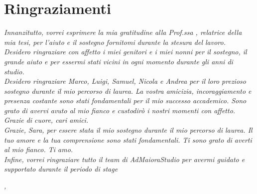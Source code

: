 \cleardoublepage
{}
{}



\bigskip

\begingroup
\let\clearpage\relax
\let\cleardoublepage\relax
\let\cleardoublepage\relax

\chapter*{Ringraziamenti}

\noindent \textit{Innanzitutto, vorrei esprimere la mia gratitudine alla Prof.ssa \myProf, relatrice della mia tesi, per l'aiuto e il sostegno fornitomi durante la stesura del lavoro.}\\

\noindent \textit{Desidero ringraziare con affetto i miei genitori e i miei nonni per il sostegno, il grande aiuto e per essermi stati vicini in ogni momento durante gli anni di studio.}\\

\noindent \textit{Desidero ringraziare Marco, Luigi, Samuel, Nicola e Andrea per il loro prezioso sostegno durante il mio percorso di laurea. La vostra amicizia, incoraggiamento e presenza costante sono stati fondamentali per il mio successo accademico. Sono grato di avervi avuto al mio fianco e custodirò i nostri momenti con affetto. Grazie di cuore, cari amici.}\\

\noindent \textit{Grazie, Sara, per essere stata il mio sostegno durante il mio percorso di laurea. Il tuo amore e la tua comprensione sono stati fondamentali. Ti sono grato di averti al mio fianco. Ti amo.}\\

\noindent \textit{Infine, vorrei ringraziare tutto il team di AdMaioraStudio per avermi guidato e supportato durante il periodo di stage}\\

\bigskip

\noindent\textit{\myLocation, \myTime}
\hfill \myName

\endgroup
